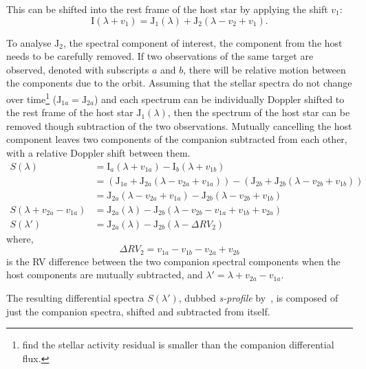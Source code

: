 This can be shifted into the rest frame of the host star by applying the shift \(v_1\):
\begin{equation}
\textrm{I}(\lambda + v_{1}) = \textrm{J}_{1}(\lambda) + \textrm{J}_{2}(\lambda - v_{2} + v_{1}).
\end{equation}

To analyse \(\textrm{J}_2\), the spectral component of interest, the component from the host needs to be carefully removed.
If two observations of the same target are observed, denoted with subscripts \(a\) and \(b\), there will be relative motion between the components due to the orbit.
Assuming that the stellar spectra do not change over time\footnote{\citep{kostogryz_spectral_2013} find the stellar activity residual is smaller than the companion differential flux.} (\(\textrm{J}_{1a} = \textrm{J}_{2a}\)) and each spectrum can be individually Doppler shifted to the rest frame of the host star \(\textrm{J}_{1}(\lambda)\), then the spectrum of the host star can be removed though subtraction of the two observations.
Mutually cancelling the host component leaves two components of the companion subtracted from each other, with a relative Doppler shift between them.
\begin{align}
S(\lambda) &= \textrm{I}_{a}(\lambda + v_{1a}) - \textrm{I}_{b}(\lambda + v_{1b}) \nonumber \\
&= (\textrm{J}_{1a} + \textrm{J}_{2a}(\lambda - v_{2a} + v_{1a})) - (\textrm{J}_{2b} +\textrm{J}_{2b}(\lambda - v_{2b} + v_{1b})) \nonumber \\
&= \textrm{J}_{2a}(\lambda - v_{2a} + v_{1a}) - \textrm{J}_{2b}(\lambda - v_{2b} + v_{1b}) \nonumber \\
S(\lambda + v_{2a}-v_{1a}) &= \textrm{J}_{2a}(\lambda) - \textrm{J}_{2b}(\lambda - v_{2b} - v_{1a} + v_{1b} + v_{2a})\\
S(\lambda') &= \textrm{J}_{2a}(\lambda) - \textrm{J}_{2b}(\lambda - \Delta {RV}_2) \label{eqn:sprofile}
\end{align}
where,
\begin{equation}
\Delta {RV}_2 = v_{1a} - v_{1b} - v_{2a} + v_{2b} \label{eqn:companion_difference}
\end{equation}
is the {RV} difference between the two companion spectral components when the host components are mutually subtracted,
and \(\lambda' = \lambda + v_{2a}-v_{1a}\).

The resulting differential spectra \(S({\lambda'})\), dubbed \emph{s-profile} by~\citet{ferluga_separating_1997}, is composed of just the companion spectra, shifted and subtracted from itself.

